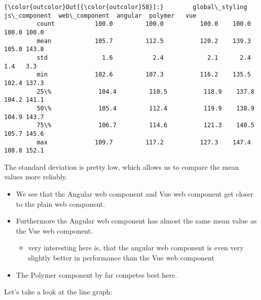 \documentclass[11pt]{article}
\providecommand{\tightlist}{%
      \setlength{\itemsep}{0pt}\setlength{\parskip}{0pt}}
\begin{document}
\begin{Verbatim}[commandchars=\\\{\}]
{\color{outcolor}Out[{\color{outcolor}58}]:}        global\_styling  js\_component  web\_component  angular  polymer   vue
         count           100.0         100.0          100.0    100.0    100.0 100.0
         mean            105.7         112.5          120.2    139.3    105.0 143.8
         std               1.6           2.4            2.1      2.4      1.4   3.3
         min             102.6         107.3          116.2    135.5    102.4 137.3
         25\%             104.4         110.5          118.9    137.8    104.2 141.1
         50\%             105.4         112.4          119.9    138.9    104.9 143.7
         75\%             106.7         114.6          121.3    140.5    105.7 145.6
         max             109.7         117.2          127.3    147.4    108.8 152.1
\end{Verbatim}
            
    The standard deviation is pretty low, which allows us to compare the
mean values more reliably.

\begin{itemize}
\tightlist
\item
  We see that the Angular web component and Vue web component get closer
  to the plain web component.
\item
  Furthermore the Angular web component has almost the same mean value
  as the Vue web component.

  \begin{itemize}
  \tightlist
  \item
    very interesting here is, that the angular web component is even
    very slightly better in performance than the Vue web component
  \end{itemize}
\item
  The Polymer component by far competes best here.
\end{itemize}

Let's take a look at the line graph:
\end{document}
